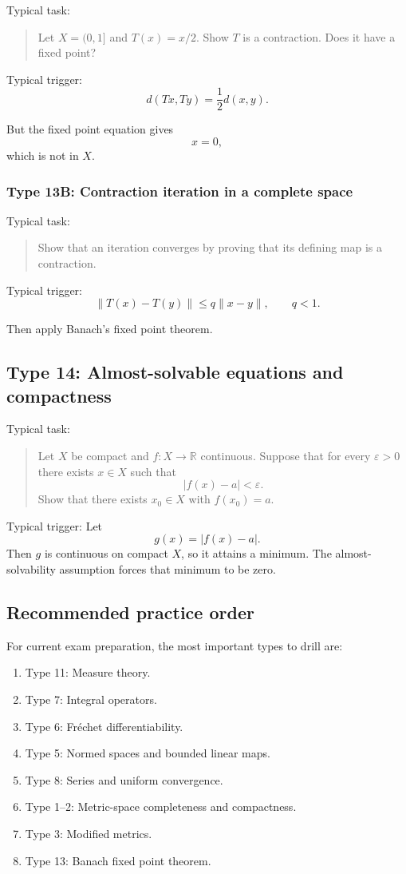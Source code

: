 Typical task:
\begin{quote}
    Let $X=(0,1]$ and $T(x)=x/2$. Show $T$ is a contraction. Does it have a fixed point?
\end{quote}

Typical trigger:
\[
    d(Tx,Ty)=\frac12d(x,y).
\]

But the fixed point equation gives
\[
    x=0,
\]
which is not in $X$.

\subsubsection*{Type 13B: Contraction iteration in a complete space}

Typical task:
\begin{quote}
    Show that an iteration converges by proving that its defining map is a contraction.
\end{quote}

Typical trigger:
\[
    \|T(x)-T(y)\|\leq q\|x-y\|,
    \qquad q<1.
\]

Then apply Banach's fixed point theorem.

\subsection{Type 14: Almost-solvable equations and compactness}

Typical task:
\begin{quote}
    Let $X$ be compact and $f:X\to\mathbb R$ continuous. Suppose that for every $\varepsilon>0$ there exists $x\in X$ such that
    \[
        |f(x)-a|<\varepsilon.
    \]
    Show that there exists $x_0\in X$ with $f(x_0)=a$.
\end{quote}

Typical trigger: Let
\[
    g(x)=|f(x)-a|.
\]
Then $g$ is continuous on compact $X$, so it attains a minimum. The almost-solvability assumption forces that minimum to be zero.

\subsection{Recommended practice order}

For current exam preparation, the most important types to drill are:

\begin{enumerate}
    \item Type 11: Measure theory.
    \item Type 7: Integral operators.
    \item Type 6: Fréchet differentiability.
    \item Type 5: Normed spaces and bounded linear maps.
    \item Type 8: Series and uniform convergence.
    \item Type 1--2: Metric-space completeness and compactness.
    \item Type 3: Modified metrics.
    \item Type 13: Banach fixed point theorem.
\end{enumerate}


